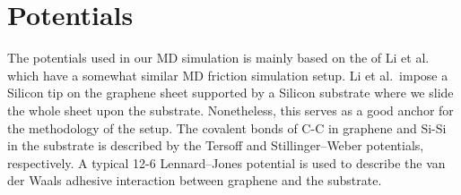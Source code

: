 







\section{Potentials}


The potentials used in our MD simulation is mainly based on the of Li et al.\
\cite{li_evolving_2016} which have a somewhat similar MD friction simulation
setup. Li et al.\ impose a Silicon tip on the graphene sheet supported by a
Silicon substrate where we slide the whole sheet upon the substrate.
Nonetheless, this serves as a good anchor for the methodology of the setup. The
covalent bonds of C-C in graphene and Si-Si in the substrate is described by the
Tersoff and Stillinger–Weber potentials, respectively. A typical 12-6
Lennard–Jones potential is used to describe the van der Waals adhesive
interaction between graphene and the substrate. 

